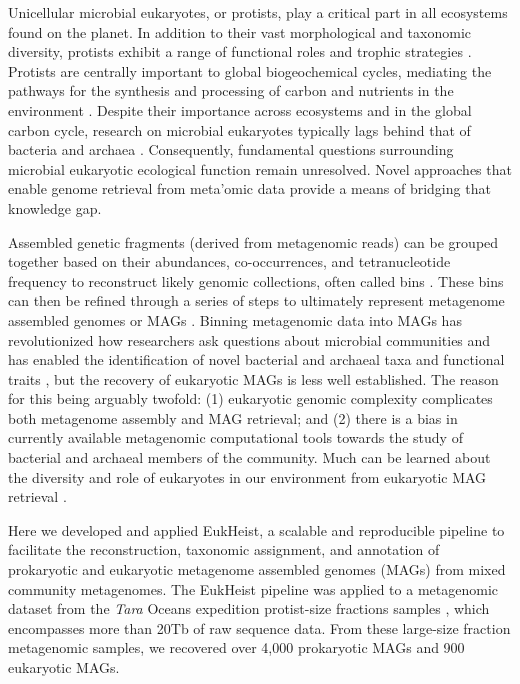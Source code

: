 \documentclass[12pt]{article}
\numberwithin{equation}{section}
\begin{document}
Unicellular microbial eukaryotes, or protists, play a critical part in all ecosystems found on the planet. In addition to their vast morphological and taxonomic diversity, protists exhibit a range of functional roles and trophic strategies \citep{Caron2011Marine}. Protists are centrally important to global biogeochemical cycles, mediating the pathways for the synthesis and processing of carbon and nutrients in the environment \citep{mitra2014role,Caron2017Probing,strom2008microbial}. Despite their importance across ecosystems and in the global carbon cycle, research on microbial eukaryotes typically lags behind that of bacteria and archaea \citep{Caron2009Hypotheses, Keeling2017Marine}. Consequently, fundamental questions surrounding microbial eukaryotic ecological function remain unresolved. Novel approaches that enable genome retrieval from meta'omic data provide a means of bridging that knowledge gap. 

Assembled genetic fragments (derived from metagenomic reads) can be grouped together based on their abundances, co-occurrences, and tetranucleotide frequency to reconstruct likely genomic collections, often called bins \citep{Alneberg2014Binning, Wu2014MaxBin, Kang_2019, Graham2017BinSanity}. These bins can then be refined through a series of steps to ultimately represent metagenome assembled genomes or MAGs  \citep{Parks2017Recovery, Delmont2018Nitrogen-fixing, Tully2018reconstruction, Almeida2019new}. Binning metagenomic data into MAGs has revolutionized how researchers ask questions about microbial communities and has enabled the identification of novel bacterial and archaeal taxa and functional traits \citep{Rinke2019phylogenomic, Tully2019Metabolic}, but the recovery of eukaryotic MAGs is less well established. The reason for this being arguably twofold: (1) eukaryotic genomic complexity \citep{Zhang2011practical} complicates both metagenome assembly and MAG retrieval; and (2) there is a bias in currently available metagenomic computational tools towards the study of bacterial and archaeal members of the community. Much can be learned about the diversity and role of eukaryotes in our environment from eukaryotic MAG retrieval \citep{Olm2019Genome-resolved}.

Here we developed and applied EukHeist, a scalable and reproducible pipeline to facilitate the reconstruction, taxonomic assignment, and annotation of prokaryotic and eukaryotic metagenome assembled genomes (MAGs) from mixed community metagenomes. The EukHeist pipeline was applied to a metagenomic dataset from the \textit{Tara} Oceans expedition protist-size fractions samples \citep{Carradec2018global}, which encompasses more than 20Tb of raw sequence data. From these large-size fraction metagenomic samples, we recovered over 4,000 prokaryotic MAGs and 900 eukaryotic MAGs. 
\end{document}
